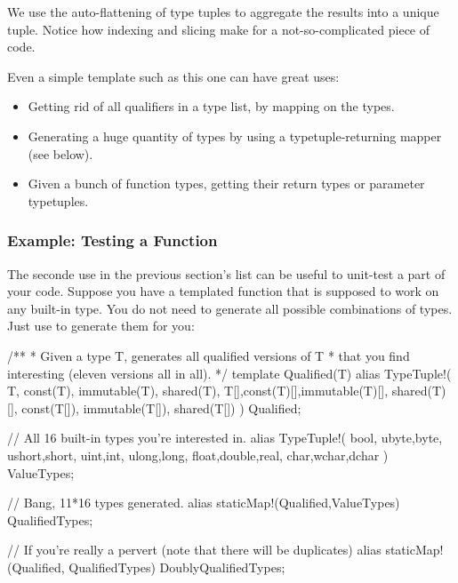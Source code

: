 
We use the auto-flattening of type tuples to aggregate the results into a unique tuple. Notice how indexing and slicing make for a not-so-complicated piece of code.

Even a simple template such as this one can have great uses:

\begin{itemize}
\item Getting rid of all qualifiers in a type list, by mapping  on the types.
\item Generating a huge quantity of types by using a typetuple-returning mapper (see below).
\item Given a bunch of function types, getting their return types or parameter typetuples.
\end{itemize}

\subsubsection{Example: Testing a Function}

The seconde use in the previous section's list can be useful to unit-test a part of your code. Suppose you have a templated function that is supposed to work on any built-in type. You do not need to generate all possible combinations of types. Just use  to generate them for you:

\begin{dcode}
/** 
* Given a type T, generates all qualified versions of T
* that you find interesting (eleven versions all in all).
*/
template Qualified(T)
{
    alias TypeTuple!(
                     T, const(T), immutable(T), shared(T),
                     T[],const(T)[],immutable(T)[], shared(T)[], 
                     const(T[]), immutable(T[]), shared(T[])
                    ) Qualified;
}

// All 16 built-in types you're interested in.
alias TypeTuple!(
                 bool,
                 ubyte,byte,
                 ushort,short,
                 uint,int,
                 ulong,long,
                 float,double,real,
                 char,wchar,dchar
                ) ValueTypes;

// Bang, 11*16 types generated.
alias staticMap!(Qualified,ValueTypes) QualifiedTypes;

// If you're really a pervert (note that there will be duplicates)
alias staticMap!(Qualified, QualifiedTypes) DoublyQualifiedTypes;
\end{dcode}

